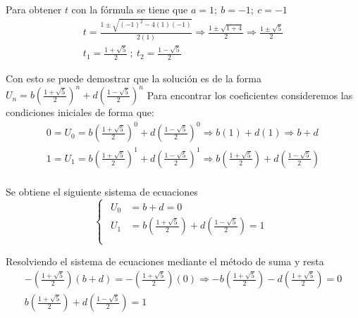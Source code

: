 \documentclass[letterpaper,11pt, fleqn]{article}
\begin{document}
Para obtener $t$ con la fórmula se tiene que $a = 1; \ b = -1; \ c = -1$
\begin{equation*}
\begin{aligned}
	t = \frac{1 \pm \sqrt{(-1)^2 - 4(1)(-1)}}{2(1)} \Rightarrow \frac{1 \pm \sqrt{1 + 4}}{2} \Rightarrow \frac{1 \pm \sqrt{5}}{2} \\
	t_{1} = \frac{1 + \sqrt{5}}{2} \ ; \ t_{2} = \frac{1 - \sqrt{5}}{2}
\end{aligned}	
\end{equation*}

Con esto se puede demostrar que la solución es de la forma $ U_{n} = b(\frac{1 + \sqrt{5}}{2})^{n} + d(\frac{1 - \sqrt{5}}{2})^{n} $ \smallbreak
Para encontrar los coeficientes consideremos las condiciones iniciales de forma que:
\begin{equation*}
\begin{aligned}
	0 = U_{0} = b(\frac{1 + \sqrt{5}}{2})^{0} + d(\frac{1 - \sqrt{5}}{2})^{0} \Rightarrow b(1) + d(1) \Rightarrow b + d \\
	1 = U_{1} = b(\frac{1 + \sqrt{5}}{2})^{1} + d(\frac{1 - \sqrt{5}}{2})^{1} \Rightarrow b(\frac{1 + \sqrt{5}}{2}) + d(\frac{1 - \sqrt{5}}{2})\\
\end{aligned}
\end{equation*}

Se obtiene el siguiente sistema de ecuaciones
\begin{equation*}
	\begin{cases}
		\begin{aligned}
			U_{0} &= b + d = 0\\
			U_{1} &= b(\frac{1 + \sqrt{5}}{2}) + d(\frac{1 - \sqrt{5}}{2}) = 1\\
		\end{aligned}
	\end{cases}
\end{equation*}

Resolviendo el sistema de ecuaciones mediante el método de suma y resta
\begin{equation*}
	\begin{aligned}
		-(\frac{1 + \sqrt{5}}{2})(b+d) = -(\frac{1 + \sqrt{5}}{2})(0) \Longrightarrow -b(\frac{1 + \sqrt{5}}{2}) - d(\frac{1 + \sqrt{5}}{2}) = 0 \\
		b(\frac{1 + \sqrt{5}}{2}) + d(\frac{1 - \sqrt{5}}{2}) = 1
	\end{aligned}
\end{equation*}
\end{document}
